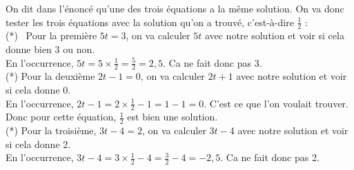 \documentclass["../Cours.tex"]{subfiles}
\begin{document}
\begin{questions}
    \clearpage

    On dit dans l'énoncé qu'une des trois équations a la même solution. On va donc tester les trois équations avec la solution qu'on a trouvé, c'est-à-dire $\frac{1}{2}$ :\\

    (*)~ Pour la première $5t=3$, on va calculer $5t$ avec notre solution et voir si cela donne bien 3 ou non.\\
    En l'occurrence, $5t = 5\times \frac{1}{2} = \frac{5}{2} = 2{,}5$. Ca ne fait donc pas 3.\\

    (*) Pour la deuxième $2t-1=0$, on va calculer $2t+1$ avec notre solution et voir si cela donne 0.\\
    En l'occurrence, $2t-1 = 2 \times \frac{1}{2} - 1 = 1 - 1 = 0$. C'est ce que l'on voulait trouver. Donc pour cette équation, $\frac{1}{2}$ est bien une solution.\\

    (*) Pour la troisième, $3t-4=2$, on va calculer $3t-4$ avec notre solution et voir si cela donne 2.\\
    En l'occurrence, $3t-4 = 3 \times \frac{1}{2} - 4 = \frac{3}{2} - 4 = -2{,}5$. Ca ne fait donc pas 2.
\end{questions}
\end{document}
